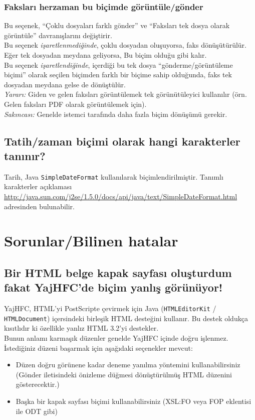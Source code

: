 \documentclass[a4paper,10pt]{scrartcl}
\begin{document}
\subsubsection{Faksları herzaman bu biçimde görüntüle/gönder}
Bu seçenek, ``Çoklu dosyaları farklı gönder'' ve ``Faksları tek dosya olarak görüntüle'' davranışlarını değiştirir.\\
Bu seçenek \textit{işaretlenmediğinde}, çoklu dosyadan oluşuyorsa, faks dönüşütürülür. Eğer tek dosyadan meydana geliyorsa, Bu biçim olduğu gibi kalır.\\
Bu seçenek \textit{işaretlendiğinde}, içerdiği bu tek dosya ``gönderme/görüntüleme biçimi'' olarak seçilen biçimden farklı bir biçime sahip olduğunda, faks tek dosyadan meydana gelse de dönüştülür.\\
\textit{Yararı:} Giden ve gelen faksları görüntülemek tek görünütüleyici kullanılır (örn. Gelen faksları PDF olarak görüntülemek için).\\
\textit{Sakıncası:} Genelde istemci tarafında daha fazla biçim dönüşümü gerekir.

\subsection{Tatih/zaman biçimi olarak hangi karakterler tanınır?}

Tarih, Java \texttt{SimpleDateFormat} kullanılarak biçimlendirilmiştir. Tanımlı karakterler açıklaması \url{http://java.sun.com/j2se/1.5.0/docs/api/java/text/SimpleDateFormat.html} adresinden bulunabilir.

\section{Sorunlar/Bilinen hatalar}

\subsection{Bir HTML belge kapak sayfası oluşturdum fakat YajHFC'de biçim yanlış görünüyor!}

YajHFC, HTML'yi PostScripte çevirmek için Java (\texttt{HTMLEditorKit} / \texttt{HTMLDocument}) içersindeki birleşik HTML desteğini kullanır. Bu destek oldukça kısıtlıdır ki özellikle yanlız HTML 3.2'yi destekler.\\
Bunun anlamı karmaşık düzenler genelde YajHFC içinde doğru işlenmez.
İstediğiniz düzeni başarmak için aşağıdaki seçenekler mevcut:

\begin{itemize}
 \item Düzen doğru görünene kadar deneme yanılma yöntemini kullanabilirsiniz (Gönder iletisindeki önizleme düğmesi dönüştürülmüş HTML düzenini gösterecektir.)
 \item Başka bir kapak sayfası biçimi kullanabilirsiniz (XSL:FO veya FOP eklentisi ile ODT gibi)
\end{itemize}
\end{document}
